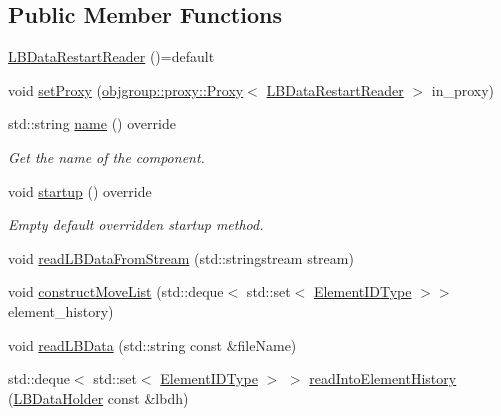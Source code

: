 \subsection*{Public Member Functions}
\begin{DoxyCompactItemize}
\item 
\hyperlink{structvt_1_1vrt_1_1collection_1_1balance_1_1_l_b_data_restart_reader_a66d7aad803c86006eb72e95d46aa945a}{L\+B\+Data\+Restart\+Reader} ()=default
\item 
void \hyperlink{structvt_1_1vrt_1_1collection_1_1balance_1_1_l_b_data_restart_reader_ae30c9f24751a3d57be687c0b1b66c6a2}{set\+Proxy} (\hyperlink{structvt_1_1objgroup_1_1proxy_1_1_proxy}{objgroup\+::proxy\+::\+Proxy}$<$ \hyperlink{structvt_1_1vrt_1_1collection_1_1balance_1_1_l_b_data_restart_reader}{L\+B\+Data\+Restart\+Reader} $>$ in\+\_\+proxy)
\item 
std\+::string \hyperlink{structvt_1_1vrt_1_1collection_1_1balance_1_1_l_b_data_restart_reader_a2d715003c589c23a80346e4f84443fc4}{name} () override
\begin{DoxyCompactList}\small\item\em Get the name of the component. \end{DoxyCompactList}\item 
void \hyperlink{structvt_1_1vrt_1_1collection_1_1balance_1_1_l_b_data_restart_reader_a38c23202434f16113d3c7e474013627a}{startup} () override
\begin{DoxyCompactList}\small\item\em Empty default overridden startup method. \end{DoxyCompactList}\item 
void \hyperlink{structvt_1_1vrt_1_1collection_1_1balance_1_1_l_b_data_restart_reader_ad8f831d516dc5b438db5cbc0f36e47a5}{read\+L\+B\+Data\+From\+Stream} (std\+::stringstream stream)
\item 
void \hyperlink{structvt_1_1vrt_1_1collection_1_1balance_1_1_l_b_data_restart_reader_a80647a51033d5b3dfa61ee916d0c522c}{construct\+Move\+List} (std\+::deque$<$ std\+::set$<$ \hyperlink{namespacevt_1_1vrt_1_1collection_1_1balance_a592736f733df4f90856df90a1fd08905}{Element\+I\+D\+Type} $>$$>$ element\+\_\+history)
\item 
void \hyperlink{structvt_1_1vrt_1_1collection_1_1balance_1_1_l_b_data_restart_reader_a663c6182169b2fb68e89fbfc69077700}{read\+L\+B\+Data} (std\+::string const \&file\+Name)
\item 
std\+::deque$<$ std\+::set$<$ \hyperlink{namespacevt_1_1vrt_1_1collection_1_1balance_a592736f733df4f90856df90a1fd08905}{Element\+I\+D\+Type} $>$ $>$ \hyperlink{structvt_1_1vrt_1_1collection_1_1balance_1_1_l_b_data_restart_reader_a35a0e4f0d496c1ecc51dd673699e567c}{read\+Into\+Element\+History} (\hyperlink{structvt_1_1vrt_1_1collection_1_1balance_1_1_l_b_data_holder}{L\+B\+Data\+Holder} const \&lbdh)
$$
\end{DoxyCompactItemize}
